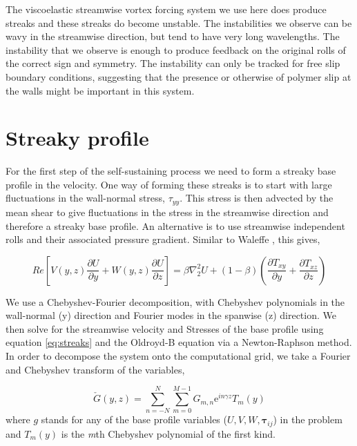 \documentclass{jfm}
\newcommand{\me}{\mathrm{e}}
\begin{document}
The viscoelastic streamwise vortex forcing system we use here does produce
streaks and these streaks do become unstable. The instabilities we observe can
be wavy in the streamwise direction, but tend to have very long wavelengths.
The instability that we observe is enough to produce feedback on the original
rolls of the correct sign and symmetry. The instability can only be tracked for
free slip boundary conditions, suggesting that the presence or otherwise of
polymer slip at the walls might be important in this system. 

\section{Streaky profile}\label{sec:streaks}

For the first step of the self-sustaining process we need to form a streaky
base profile in the velocity. One way of forming these streaks is to start with large
fluctuations in the wall-normal stress, $\tau_{yy}$. This stress is then
advected by the mean shear to give fluctuations in the stress in the streamwise
direction and therefore a streaky base profile. An alternative is to use
streamwise independent rolls and their associated pressure gradient. Similar to
Waleffe \cite{Waleffe1997}, this gives,

\begin{equation}
    \mathit{Re} \left[ V(y,z) \frac{\partial U}{\partial y} + W(y,z) \frac{\partial U}{\partial z} \right] = \beta \nabla^{2}_{2} U + \left(1-\beta \right) \left(\frac{\partial T_{xy}}{\partial y} + \frac{\partial T_{xz}}{\partial z} \right) \label{eq:streaks}
\end{equation}

We use a Chebyshev-Fourier decomposition, with Chebyshev polynomials in the
wall-normal (y) direction and Fourier modes in the spanwise (z) direction. We
then solve for the streamwise velocity and Stresses of the base profile using
equation \ref{eq:streaks} and the Oldroyd-B equation via a Newton-Raphson
method. In order to decompose the system onto the computational grid, we take a
Fourier and Chebyshev transform of the variables,

\begin{equation}
    \check{G}(y,z) = \sum_{n=-N}^{N} \sum_{m=0}^{M-1} G_{m,n} \me^{i n \gamma z} T_{m}(y) \label{eq:decomp}
\end{equation}
where $g$ stands for any of the base profile variables
($U,V,W,\boldsymbol{\tau}_{ij}$) in the problem and $T_{m}(y)$ is the
\textit{m}th Chebyshev polynomial of the first kind.
\end{document}
